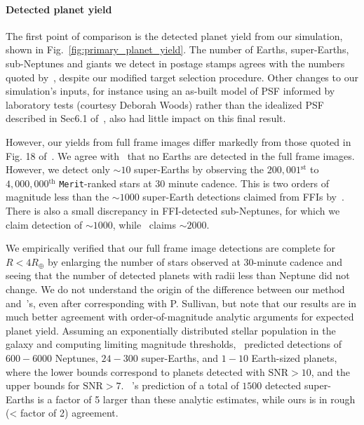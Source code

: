 \paragraph{Detected planet yield}
The first point of comparison is the detected planet yield from our simulation, shown in Fig.~\ref{fig:primary_planet_yield}.
The number of Earths, super-Earths, sub-Neptunes and giants we detect in postage stamps agrees with the numbers quoted by~, despite our modified target selection procedure.
Other changes to our simulation's inputs, for instance using an as-built model of \tesss PSF informed by laboratory tests (courtesy Deborah Woods) rather than the idealized PSF described in Sec6.1 of~, also had little impact on this final result.

However, our yields from full frame images differ markedly from those quoted in Fig. 18 of~.
We agree with~ that no Earths are detected in the full frame images.
However, we detect only $\sim10$ super-Earths by observing the $200,001\mathrm{^{st}}$ to $4,000,000\mathrm{^{th}}$ \texttt{Merit}-ranked stars at 30 minute cadence.
This is two orders of magnitude less than the $\sim1000$ super-Earth detections claimed from FFIs by~.
There is also a small discrepancy in FFI-detected sub-Neptunes, for which we claim detection of $\sim1000$, while~ claims $\sim2000$.

We empirically verified that our full frame image detections are complete for $R < 4R_\oplus$ by enlarging the number of stars observed at 30-minute cadence and seeing that the number of detected planets with radii less than Neptune did not change.
We do not understand the origin of the difference between our method and~'s, even after corresponding with P. Sullivan, but note that our results are in much better agreement with order-of-magnitude analytic arguments for \tesss expected planet yield.
Assuming an exponentially distributed stellar population in the galaxy and computing limiting magnitude thresholds,~\citet{winn_searchable_2013} predicted detections of $600-6000$ Neptunes, $24-300$ super-Earths, and $1-10$ Earth-sized planets, where the lower bounds correspond to planets detected with $\mathrm{SNR}>10$, and the upper bounds for $\mathrm{SNR}>7$.
~'s prediction of a total of $1500$ detected super-Earths is a factor of 5 larger than these analytic estimates, while ours is in rough (< factor of 2) agreement.

